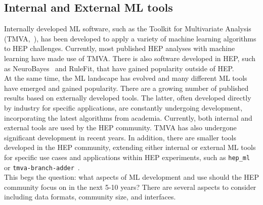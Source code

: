 \subsection{Internal and External ML tools}


Internally developed ML software, such as the Toolkit for Multivariate Analysis (TMVA,~\cite{TMVA}), has been developed to apply a variety of machine learning algorithms to HEP challenges. Currently, most published HEP analyses with machine learning have made use of TMVA. There is also software developed in HEP, such as NeuroBayes~\cite{neurobayes,neurobayes2} and RuleFit, that have gained popularity outside of HEP.\\

At the same time, the ML landscape has evolved and many different ML tools have emerged and gained popularity. There are a growing number of published results based on externally developed tools. The latter, often developed directly by industry for specific applications, are constantly undergoing development, incorporating the latest algorithms from academia. Currently, both internal and external tools are used by the HEP community. TMVA has also undergone significant development in recent years.
In addition, there are smaller tools developed in the HEP community, extending either internal or external ML tools for specific use cases and applications within HEP experiments, such as \texttt{hep\_ml}~\cite{hep_ml} or \texttt{tmva-branch-adder}~\cite{tmva-branch-adder}.\\

This begs the question: what aspects of ML development and use should the HEP community focus on in the next 5-10 years? There are several aspects to consider including data formats, community size, and interfaces.

